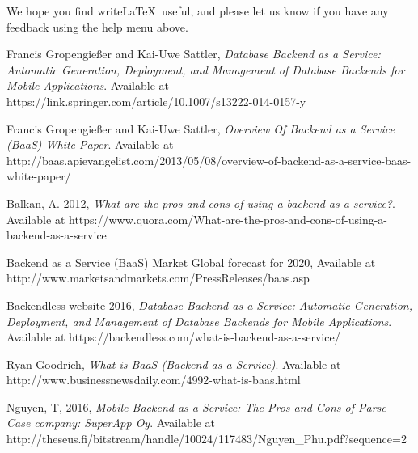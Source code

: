 \documentclass[a4paper]{report}
\begin{document}
    We hope you find write\LaTeX\ useful, and please let us know if you have any feedback using the help menu above.

    

    \begin{thebibliography}{9}
    	Francis Gropengießer and Kai-Uwe Sattler,
      \emph{Database Backend as a Service: Automatic Generation, Deployment, and Management of Database Backends for Mobile Applications}.
			Available at https://link.springer.com/article/10.1007/s13222-014-0157-y
			
    	Francis Gropengießer and Kai-Uwe Sattler,
      \emph{Overview Of Backend as a Service (BaaS) White Paper}.
			Available at http://baas.apievangelist.com/2013/05/08/overview-of-backend-as-a-service-baas-white-paper/
			
								
			Balkan, A. 2012,
      \emph{What are the pros and cons of using a backend as a service?}.
			Available at https://www.quora.com/What-are-the-pros-and-cons-of-using-a-backend-as-a-service
		
			Backend as a Service (BaaS) Market Global forecast for 2020,
			Available at http://www.marketsandmarkets.com/PressReleases/baas.asp		
		
			Backendless website 2016,
      \emph{Database Backend as a Service: Automatic Generation, Deployment, and Management of Database Backends for Mobile Applications}.
			Available at https://backendless.com/what-is-backend-as-a-service/
	

			Ryan Goodrich,
      \emph{What is BaaS (Backend as a Service)}.
			Available at http://www.businessnewsdaily.com/4992-what-is-baas.html	
			
			Nguyen, T, 2016,
      \emph{Mobile Backend as a Service: The Pros and Cons of Parse
			Case company: SuperApp Oy}.
			Available at http://theseus.fi/bitstream/handle/10024/117483/Nguyen{\_}Phu.pdf?sequence=2
		
		\end{thebibliography}	
    
\end{document}
